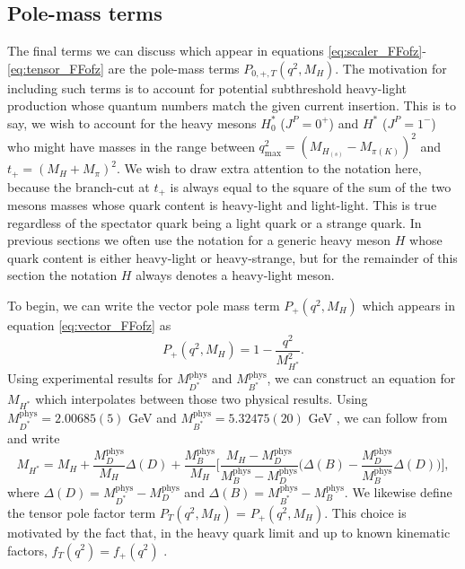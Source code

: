 \subsection{Pole-mass terms}\label{sec:pole-mass_terms}
The final terms we can discuss which appear in equations \ref{eq:scaler_FFofz}-\ref{eq:tensor_FFofz} are the pole-mass terms $P_{0,+,T}(q^2,M_H)$.  The motivation for including such terms is to account for potential subthreshold heavy-light production whose quantum numbers match the given current insertion.  This is to say, we wish to account for the heavy mesons $H_0^*$ ($J^P=0^+$) and $H^*$ ($J^P=1^-$) who might have masses in the range between $q^2_\mathrm{max}=(M_{H_{(s)}}-M_{\pi(K)})^2$ and $t_+=(M_H+M_\pi)^2$.  We wish to draw extra attention to the notation here, because the branch-cut at $t_+$ is always equal to the square of the sum of the two mesons masses whose quark content is heavy-light and light-light.  This is true regardless of the spectator quark being a light quark or a strange quark.  In previous sections we often use the notation for a generic heavy meson $H$ whose quark content is either heavy-light or heavy-strange, but for the remainder of this section the notation $H$ always denotes a heavy-light meson.

To begin, we can write the vector pole mass term $P_+(q^2,M_H)$ which appears in equation \ref{eq:vector_FFofz} as 
\begin{equation}\label{eq:vector_pole_term}
    P_{+}(q^2,M_H) = 1 - \frac{q^2}{{M^2_{H^{*}}}}.
\end{equation}
Using experimental results for $M_{D^*}^\mathrm{phys}$ and $M_{B^*}^\mathrm{phys}$, we can construct an equation for $M_{H^*}$ which interpolates between those two physical results. Using $M_{D^*}^\mathrm{phys}=2.00685(5)$ GeV and $M_{B^*}^\mathrm{phys}=5.32475(20)$ GeV \cite{ParticleDataGroup:2024cfk}, we can follow from \cite{Will_technical,davies_bs_to_ds} and write
\begin{equation}\label{eq:vectorpolemass}
    M_{H^*}=M_{H}+\frac{M^{\mathrm{phys}}_{D}}{M_{H}}\Delta(D) + \frac{M^{\mathrm{phys}}_{B}}{M_{H}}\Big[\frac{M_{H}-M^{\mathrm{phys}}_{D}}{M^{\mathrm{phys}}_{B}-M^{\mathrm{phys}}_{D}}\Big(\Delta(B)-\frac{M^{\mathrm{phys}}_{D}}{M^{\mathrm{phys}}_{B}}\Delta(D)\Big)\Big],
\end{equation}
where $\Delta(D) = M^\mathrm{phys}_{D^*} - M^\mathrm{phys}_{D}$ and $\Delta(B) = M^\mathrm{phys}_{B^*} - M^\mathrm{phys}_{B}$.  We likewise define the tensor pole factor term $P_T(q^2,M_H)$ = $P_+(q^2,M_H)$.  This choice is motivated by the fact that, in the heavy quark limit and up to known kinematic factors, $f_T(q^2) = f_+(q^2)$ \cite{PhysRevD.73.014012}.

